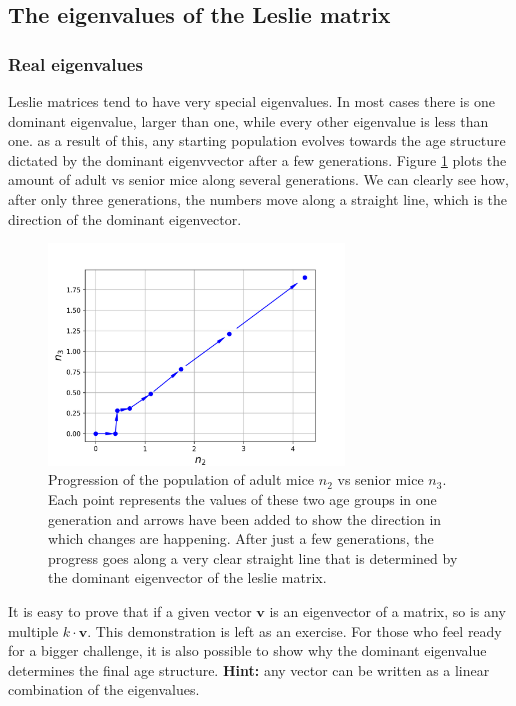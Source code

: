 \documentclass[12pt]{article}
\begin{document}
\subsection{The eigenvalues of the Leslie matrix}

\subsubsection{Real eigenvalues}
Leslie matrices tend to have very special eigenvalues. In most cases there is one dominant eigenvalue, larger than one, while every other eigenvalue is less than one. as a result of this, any starting population evolves towards the age structure dictated by the dominant eigenvvector after a few generations. Figure \ref{fig:leslie_phase} plots the amount of adult vs senior mice along several generations. We can clearly see how, after only three generations, the numbers move along a straight line, which is the direction of the dominant eigenvector.

\begin{figure}
	\begin{center}
		\includegraphics[width=0.7\textwidth]{project_n2_n3}	
	\end{center}
	\caption{Progression of the population of adult mice $n_2$ vs senior mice $n_3$. Each point represents the values of these two age groups in one generation and arrows have been added to show the direction in which changes are happening. After just a few generations, the progress goes along a very clear straight line that is determined by the dominant eigenvector of the leslie matrix. }
	\label{fig:leslie_phase}
\end{figure}

It is easy to prove that if a given vector $\mathbf{v}$ is an eigenvector of a matrix, so is any multiple $k \cdot\mathbf{v}$. This demonstration is left as an exercise. For those who feel ready for a bigger challenge, it is also possible to show why the dominant eigenvalue determines the final age structure. \textbf{Hint:} any vector can be written as a linear combination of the eigenvalues.
\end{document}
